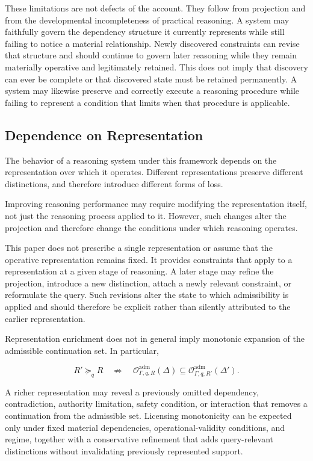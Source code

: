 \documentclass[11pt]{article}
\theoremstyle{definition}
\theoremstyle{remark}
\begin{document}
These limitations are not defects of the account. They follow from projection and from the developmental incompleteness of practical reasoning. A system may faithfully govern the dependency structure it currently represents while still failing to notice a material relationship. Newly discovered constraints can revise that structure and should continue to govern later reasoning while they remain materially operative and legitimately retained. This does not imply that discovery can ever be complete or that discovered state must be retained permanently. A system may likewise preserve and correctly execute a reasoning procedure while failing to represent a condition that limits when that procedure is applicable.

\subsection{Dependence on Representation}

The behavior of a reasoning system under this framework depends on the representation over which it operates. Different representations preserve different distinctions, and therefore introduce different forms of loss.

Improving reasoning performance may require modifying the representation itself, not just the reasoning process applied to it. However, such changes alter the projection and therefore change the conditions under which reasoning operates.

This paper does not prescribe a single representation or assume that the operative representation remains fixed. It provides constraints that apply to a representation at a given stage of reasoning. A later stage may refine the projection, introduce a new distinction, attach a newly relevant constraint, or reformulate the query. Such revisions alter the state to which admissibility is applied and should therefore be explicit rather than silently attributed to the earlier representation.

Representation enrichment does not in general imply monotonic expansion of the admissible continuation set. In particular,

\[
R'\succeq_q R
\quad\not\Rightarrow\quad
\mathcal O^{\mathrm{adm}}_{\Gamma,q,R}(\Delta)
\subseteq
\mathcal O^{\mathrm{adm}}_{\Gamma,q,R'}(\Delta').
\]

A richer representation may reveal a previously omitted dependency, contradiction, authority limitation, safety condition, or interaction that removes a continuation from the admissible set. Licensing monotonicity can be expected only under fixed material dependencies, operational-validity conditions, and regime, together with a conservative refinement that adds query-relevant distinctions without invalidating previously represented support.
\end{document}
